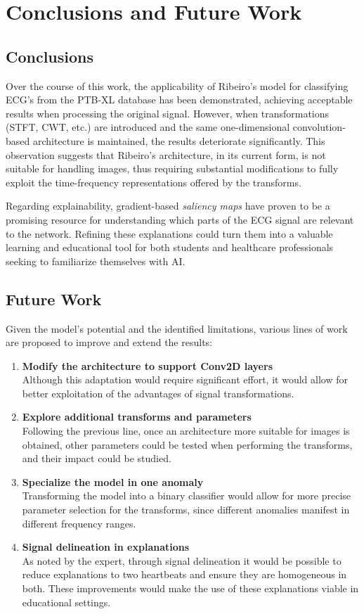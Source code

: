 \chapter*{Conclusions and Future Work}
\label{cap:conclusions}
\section{Conclusions}
Over the course of this work, the applicability of Ribeiro’s model for classifying ECG's from the PTB-XL database has been demonstrated, achieving acceptable results when processing the original signal. However, when transformations (STFT, CWT, etc.) are introduced and the same one-dimensional convolution-based architecture is maintained, the results deteriorate significantly. This observation suggests that Ribeiro’s architecture, in its current form, is not suitable for handling images, thus requiring substantial modifications to fully exploit the time-frequency representations offered by the transforms.

Regarding explainability, gradient-based \emph{saliency maps} have proven to be a promising resource for understanding which parts of the ECG signal are relevant to the network. Refining these explanations could turn them into a valuable learning and educational tool for both students and healthcare professionals seeking to familiarize themselves with AI.

\section{Future Work}
Given the model’s potential and the identified limitations, various lines of work are proposed to improve and extend the results:
\begin{enumerate}
	\item \textbf{Modify the architecture to support Conv2D layers} \\
	Although this adaptation would require significant effort, it would allow for better exploitation of the advantages of signal transformations.
	\item \textbf{Explore additional transforms and parameters} \\
	Following the previous line, once an architecture more suitable for images is obtained, other parameters could be tested when performing the transforms, and their impact could be studied.
	\item \textbf{Specialize the model in one anomaly} \\
	Transforming the model into a binary classifier would allow for more precise parameter selection for the transforms, since different anomalies manifest in different frequency ranges.
	\item \textbf{Signal delineation in explanations} \\
	As noted by the expert, through signal delineation it would be possible to reduce explanations to two heartbeats and ensure they are homogeneous in both. These improvements would make the use of these explanations viable in educational settings.
\end{enumerate}
